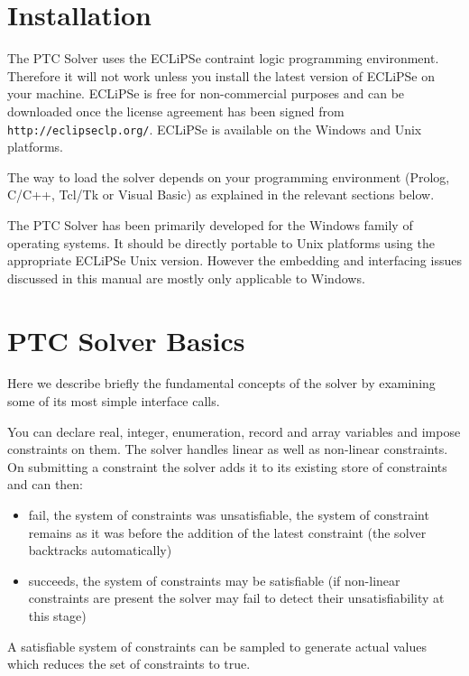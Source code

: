 \documentclass{article}
\begin{document}
\section{Installation}

The PTC Solver uses the ECLiPSe contraint logic programming environment.
Therefore
it will not work unless you install the latest version of ECLiPSe on your
machine. ECLiPSe is free for non-commercial purposes and can be downloaded once
the license agreement has been signed from
\texttt{http://eclipseclp.org/}.
ECLiPSe is available on the Windows and Unix platforms.

The way to load the solver depends on your programming
environment (Prolog, C/C++, Tcl/Tk or Visual Basic) as explained in
the relevant sections below.

The PTC Solver has been primarily developed for the Windows family of operating
systems. It should be directly portable to Unix platforms using the appropriate ECLiPSe Unix version.
However the embedding and interfacing issues discussed in this manual are mostly
only applicable to Windows.

\section{PTC Solver Basics}

Here we describe briefly the fundamental concepts of the solver by examining
 some of its most simple interface calls.

You can declare real, integer, enumeration, record and array variables and impose
constraints on them.
The solver handles linear as well as non-linear constraints.
On submitting a constraint the solver adds it to its existing store of
constraints and can then:
\begin{itemize}
\item fail, the system of constraints was
unsatisfiable, the system of constraint remains as it was
before the addition of the latest constraint (the solver
backtracks automatically)
\item succeeds, the system of constraints may be satisfiable
(if non-linear constraints are present the solver may fail
to detect their unsatisfiability at this stage)
\end{itemize}

A satisfiable system of constraints can be sampled to generate actual values
which reduces the set of constraints to true.
\end{document}
